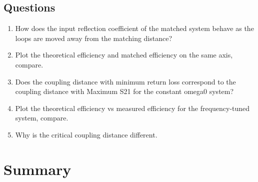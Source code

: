 \documentclass{article}
\begin{document}
\subsection{Questions}

\begin{enumerate}
	\item How does the input reflection coefficient of the matched system behave as the loops are moved away from the matching distance?
	\item Plot the theoretical efficiency and matched efficiency on the same axis, compare.
	\item Does the coupling distance with minimum return loss correspond to the coupling distance with Maximum S21 for the constant omega0 system?
	\item Plot the theoretical efficiency vs measured efficiency for the frequency-tuned system, compare.
	\item Why is the critical coupling distance different.
\end{enumerate}

\section{Summary}
\end{document}
